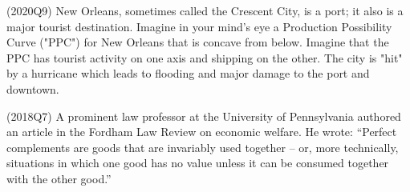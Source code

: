 \documentclass{exam}
\begin{document}
\begin{questions}

\question (2020Q9) New Orleans, sometimes called the Crescent City, is a port; it also is a major tourist destination. Imagine in your mind’s eye a Production Possibility Curve ("PPC") for New Orleans that is concave from below. Imagine that the PPC has tourist activity on one axis and shipping on the other. The city is "hit" by a hurricane which leads to flooding and major damage to the port and downtown.


\question (2018Q7) A prominent law professor at the University of Pennsylvania authored an article in the Fordham Law Review on economic welfare. He wrote: “Perfect complements are goods that are invariably used together – or, more technically, situations in which one good has no value unless it can be consumed together with the other good.”


\end{questions}
\end{document}
